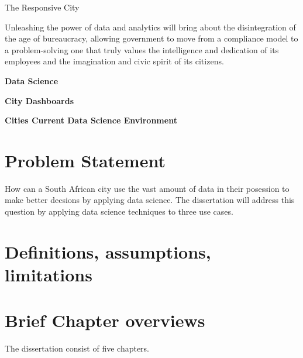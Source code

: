 \documentclass[]{book}
\theoremstyle{definition}
\theoremstyle{definition}
\theoremstyle{definition}
\theoremstyle{remark}
\begin{document}
\citep{responsiveCity} The Responsive City

Unleashing the power of data and analytics will bring about the
disintegration of the age of bureaucracy, allowing government to move
from a compliance model to a problem-solving one that truly values the
intelligence and dedication of its employees and the imagination and
civic spirit of its citizens.

\textbf{Data Science}

\textbf{City Dashboards}

\textbf{Cities Current Data Science Environment}

\section{Problem Statement}\label{problem-statement}

How can a South African city use the vast amount of data in their
posession to make better decsions by applying data science. The
dissertation will address this question by applying data science
techniques to three use cases.

\section{Definitions, assumptions,
limitations}\label{definitions-assumptions-limitations}

\section{Brief Chapter overviews}\label{brief-chapter-overviews}

The dissertation consist of five chapters.
\end{document}
